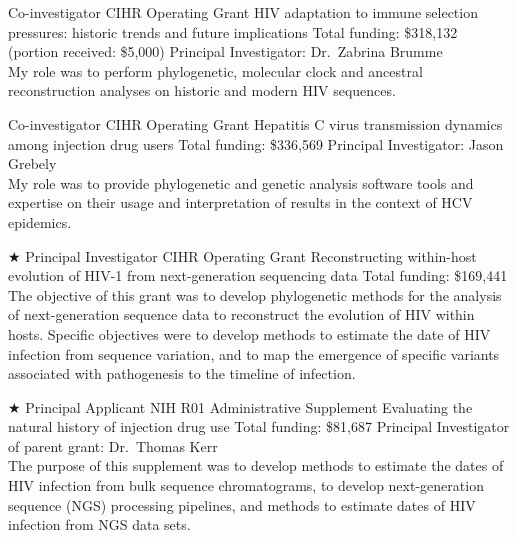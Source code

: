 {Co-investigator}
{CIHR Operating Grant}
{HIV adaptation to immune selection pressures: historic trends and future implications}
{Total funding: \$318,132 (portion received: \$5,000)}
{
Principal Investigator: Dr.~Zabrina Brumme\\
My role was to perform phylogenetic, molecular clock and ancestral reconstruction analyses on historic and modern HIV sequences.\\
}

{Co-investigator}
{CIHR Operating Grant}
{Hepatitis C virus transmission dynamics among injection drug users}
{Total funding: \$336,569}
{
Principal Investigator: Jason Grebely\\
My role was to provide phylogenetic and genetic analysis software tools and expertise on their usage and interpretation of results in the context of HCV epidemics.\\
}

{$\bigstar$ Principal Investigator}
{CIHR Operating Grant}
{Reconstructing within-host evolution of HIV-1 from next-generation sequencing data}
{Total funding: \$169,441}
{
The objective of this grant was to develop phylogenetic methods for the analysis of next-generation sequence data to reconstruct the evolution of HIV within hosts.
Specific objectives were to develop methods to estimate the date of HIV infection from sequence variation, and to map the emergence of specific variants associated with pathogenesis to the timeline of infection.\\
}


{$\bigstar$ Principal Applicant}
{NIH R01 Administrative Supplement}
{Evaluating the natural history of injection drug use}
{Total funding: \$81,687}
{
Principal Investigator of parent grant: Dr.~Thomas Kerr\\
The purpose of this supplement was to develop methods to estimate the dates of HIV infection from bulk sequence chromatograms, to develop next-generation sequence (NGS) processing pipelines, and methods to estimate dates of HIV infection from NGS data sets.\\
}


